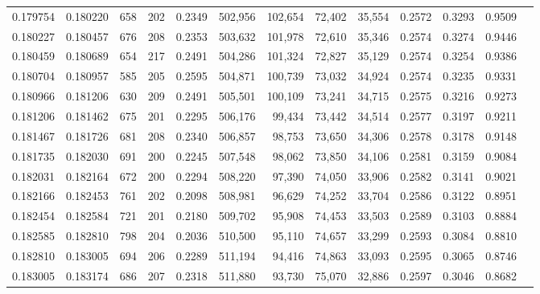 \begin{tabular}{rrrrrrrrrrrrr}
0.179754 & 0.180220 &   658 & 202 &                                     0.2349 & 502,956 & 102,654 &  72,402 &  35,554 & 0.2572 & 0.3293 & 0.9509 \\
0.180227 & 0.180457 &   676 & 208 &                                     0.2353 & 503,632 & 101,978 &  72,610 &  35,346 & 0.2574 & 0.3274 & 0.9446 \\
0.180459 & 0.180689 &   654 & 217 &                                     0.2491 & 504,286 & 101,324 &  72,827 &  35,129 & 0.2574 & 0.3254 & 0.9386 \\
0.180704 & 0.180957 &   585 & 205 &                                     0.2595 & 504,871 & 100,739 &  73,032 &  34,924 & 0.2574 & 0.3235 & 0.9331 \\
0.180966 & 0.181206 &   630 & 209 &                                     0.2491 & 505,501 & 100,109 &  73,241 &  34,715 & 0.2575 & 0.3216 & 0.9273 \\
0.181206 & 0.181462 &   675 & 201 &                                     0.2295 & 506,176 &  99,434 &  73,442 &  34,514 & 0.2577 & 0.3197 & 0.9211 \\
0.181467 & 0.181726 &   681 & 208 &                                     0.2340 & 506,857 &  98,753 &  73,650 &  34,306 & 0.2578 & 0.3178 & 0.9148 \\
0.181735 & 0.182030 &   691 & 200 &                                     0.2245 & 507,548 &  98,062 &  73,850 &  34,106 & 0.2581 & 0.3159 & 0.9084 \\
0.182031 & 0.182164 &   672 & 200 &                                     0.2294 & 508,220 &  97,390 &  74,050 &  33,906 & 0.2582 & 0.3141 & 0.9021 \\
0.182166 & 0.182453 &   761 & 202 &                                     0.2098 & 508,981 &  96,629 &  74,252 &  33,704 & 0.2586 & 0.3122 & 0.8951 \\
0.182454 & 0.182584 &   721 & 201 &                                     0.2180 & 509,702 &  95,908 &  74,453 &  33,503 & 0.2589 & 0.3103 & 0.8884 \\
0.182585 & 0.182810 &   798 & 204 &                                     0.2036 & 510,500 &  95,110 &  74,657 &  33,299 & 0.2593 & 0.3084 & 0.8810 \\
0.182810 & 0.183005 &   694 & 206 &                                     0.2289 & 511,194 &  94,416 &  74,863 &  33,093 & 0.2595 & 0.3065 & 0.8746 \\
0.183005 & 0.183174 &   686 & 207 &                                     0.2318 & 511,880 &  93,730 &  75,070 &  32,886 & 0.2597 & 0.3046 & 0.8682 \\

\end{tabular}

